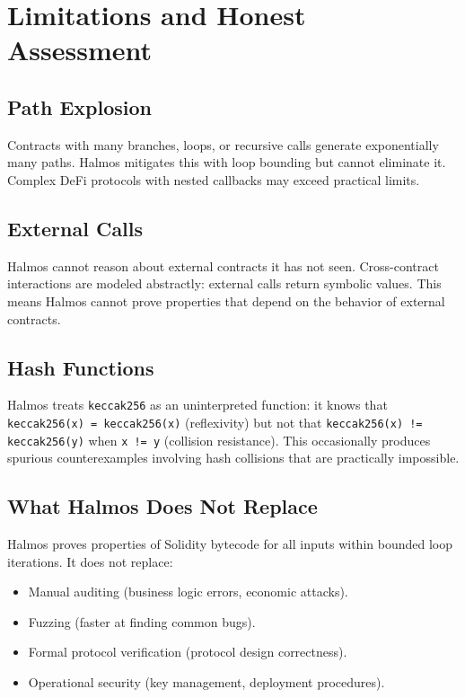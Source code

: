 \section{Limitations and Honest Assessment}


\subsection{Path Explosion}

Contracts with many branches, loops, or recursive calls generate exponentially many paths.
Halmos mitigates this with loop bounding but cannot eliminate it. Complex DeFi protocols
with nested callbacks may exceed practical limits.

\subsection{External Calls}

Halmos cannot reason about external contracts it has not seen. Cross-contract interactions
are modeled abstractly: external calls return symbolic values. This means Halmos cannot
prove properties that depend on the behavior of external contracts.

\subsection{Hash Functions}

Halmos treats \texttt{keccak256} as an uninterpreted function: it knows that
\texttt{keccak256(x) = keccak256(x)} (reflexivity) but not that
\texttt{keccak256(x) != keccak256(y)} when \texttt{x != y} (collision resistance).
This occasionally produces spurious counterexamples involving hash collisions that
are practically impossible.

\subsection{What Halmos Does Not Replace}

Halmos proves properties of Solidity bytecode for all inputs within bounded loop
iterations. It does not replace:
\begin{itemize}[nosep]
  \item Manual auditing (business logic errors, economic attacks).
  \item Fuzzing (faster at finding common bugs).
  \item Formal protocol verification (protocol design correctness).
  \item Operational security (key management, deployment procedures).
\end{itemize}

